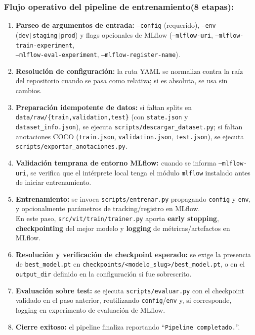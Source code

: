\documentclass[12pt,a4paper]{article}
\begin{document}
\subsubsection{Flujo operativo del pipeline de entrenamiento(8 etapas):}
\begin{enumerate}
  \item \textbf{Parseo de argumentos de entrada:} \texttt{--config} (requerido),
        \texttt{--env} (\texttt{dev|staging|prod}) y flags opcionales de MLflow
        (\texttt{--mlflow-uri}, \texttt{--mlflow-train-experiment}, \\
        \texttt{--mlflow-eval-experiment}, \texttt{--mlflow-register-name}).
  \item \textbf{Resolución de configuración:} la ruta YAML se normaliza contra la raíz
        del repositorio cuando se pasa como relativa; si es absoluta, se usa sin cambios.
  \item \textbf{Preparación idempotente de datos:}
        si faltan splits en \texttt{data/raw/\{train,validation,test\}} (con
        \texttt{state.json} y \texttt{dataset\_info.json}), se ejecuta
        \texttt{scripts/descargar\_dataset.py}; si faltan anotaciones COCO
        (\texttt{train.json}, \texttt{validation.json}, \texttt{test.json}),
        se ejecuta \texttt{scripts/exportar\_anotaciones.py}.
  \item \textbf{Validación temprana de entorno MLflow:}
        cuando se informa \texttt{--mlflow-uri}, se verifica que el intérprete local
        tenga el módulo \texttt{mlflow} instalado antes de iniciar entrenamiento.
  \item \textbf{Entrenamiento:}
        se invoca \texttt{scripts/entrenar.py} propagando \texttt{config} y \texttt{env},
        y opcionalmente parámetros de tracking/registro en MLflow. \\
        En este paso, \texttt{src/vit/train/trainer.py} aporta
        \textbf{early stopping}, \textbf{checkpointing} del mejor modelo y
        \textbf{logging} de métricas/artefactos en MLflow.
  \item \textbf{Resolución y verificación de checkpoint esperado:}
        se exige la presencia de \texttt{best\_model.pt} en
        \texttt{checkpoints/<modelo\_slug>/best\_model.pt}, o en el \texttt{output\_dir}
        definido en la configuración si fue sobrescrito.
  \item \textbf{Evaluación sobre test:}
        se ejecuta \texttt{scripts/evaluar.py} con el checkpoint validado en el paso
        anterior, reutilizando \texttt{config}/\texttt{env} y, si corresponde, logging
        en experimento de evaluación de MLflow.
  \item \textbf{Cierre exitoso:}
        el pipeline finaliza reportando ``\texttt{Pipeline completado.}''.
\end{enumerate}
\end{document}
